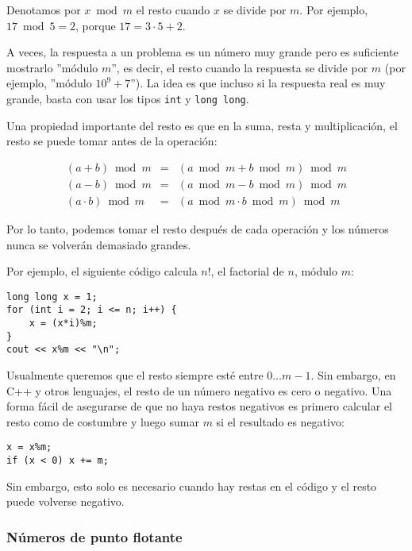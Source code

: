 
Denotamos por $x \bmod m$ el resto
cuando $x$ se divide por $m$.
Por ejemplo, $17 \bmod 5 = 2$,
porque $17 = 3 \cdot 5 + 2$.

A veces, la respuesta a un problema es un
n\'umero muy grande pero es suficiente
mostrarlo ''m\'odulo $m$'', es decir,
el resto cuando la respuesta se divide por $m$
(por ejemplo, ''m\'odulo $10^9+7$'').
La idea es que incluso si la respuesta real
es muy grande,
basta con usar los tipos
\texttt{int} y \texttt{long long}.

Una propiedad importante del resto es que
en la suma, resta y multiplicaci\'on,
el resto se puede tomar antes de la operaci\'on:

\[
\begin{array}{rcr}
(a+b) \bmod m & = & (a \bmod m + b \bmod m) \bmod m \\
(a-b) \bmod m & = & (a \bmod m - b \bmod m) \bmod m \\
(a \cdot b) \bmod m & = & (a \bmod m \cdot b \bmod m) \bmod m
\end{array}
\]

Por lo tanto, podemos tomar el resto despu\'es de cada operaci\'on
y los n\'umeros nunca se volver\'an demasiado grandes.

Por ejemplo, el siguiente c\'odigo calcula $n!$,
el factorial de $n$, m\'odulo $m$:
\begin{lstlisting}
long long x = 1;
for (int i = 2; i <= n; i++) {
    x = (x*i)%m;
}
cout << x%m << "\n";
\end{lstlisting}

Usualmente queremos que el resto siempre
est\'e entre $0\ldots m-1$.
Sin embargo, en C++ y otros lenguajes,
el resto de un n\'umero negativo
es cero o negativo.
Una forma f\'acil de asegurarse de que no
haya restos negativos es primero calcular
el resto como de costumbre y luego sumar $m$
si el resultado es negativo:
\begin{lstlisting}
x = x%m;
if (x < 0) x += m;
\end{lstlisting}
Sin embargo, esto solo es necesario cuando hay
restas en el c\'odigo y el resto puede volverse negativo.

\subsubsection{N\'umeros de punto flotante}


